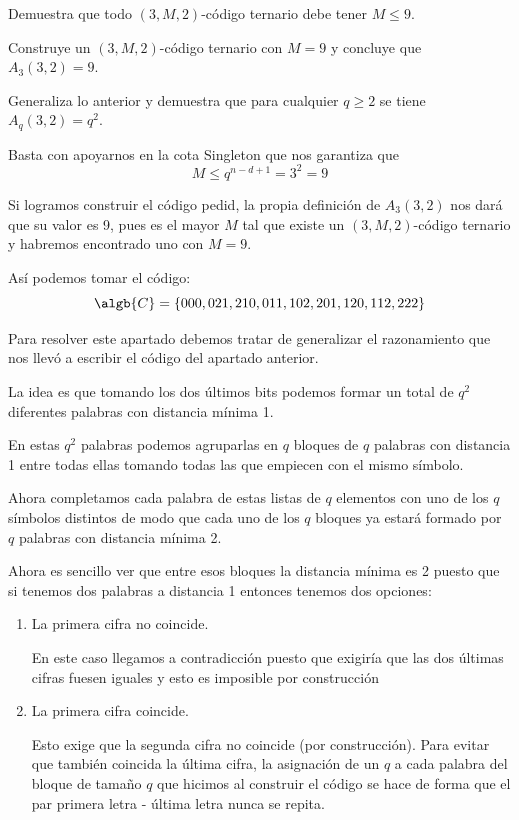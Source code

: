 \begin{problem}[2]
\ppart Demuestra que todo $(3,M,2)$-código ternario debe tener
$M\le 9$.

\ppart Construye un $(3,M,2)$-código ternario con $M=9$ y concluye que
$A_3(3,2)=9$.

\ppart Generaliza lo anterior y demuestra que para cualquier $q\ge 2$
se tiene $A_q(3,2)=q^2$.
\solution


\spart

Basta con apoyarnos en la cota Singleton que nos garantiza que
\[M \leq q^{n-d+1} = 3^{2} = 9\]

\spart

Si logramos construir el código pedid, la propia definición de $A_3(3,2)$ nos dará que su valor es 9, pues es el mayor $M$ tal que existe un $(3,M,2)$-código ternario y habremos encontrado uno con $M=9$.

Así podemos tomar el código:
\[\algb{C}=\{000,021,210,011,102,201,120,112,222\}\]

\spart

Para resolver este apartado debemos tratar de generalizar el razonamiento que nos llevó a escribir el código del apartado anterior.

La idea es que tomando los dos últimos bits podemos formar un total de $q^2$ diferentes palabras con distancia mínima 1.

En estas $q^2$ palabras podemos agruparlas en $q$ bloques de $q$ palabras con distancia 1 entre todas ellas tomando todas las que empiecen con el mismo símbolo.

Ahora completamos cada palabra de estas listas de $q$ elementos con uno de los $q$ símbolos distintos de modo que cada uno de los $q$ bloques ya estará formado por $q$ palabras con distancia mínima 2.

Ahora es sencillo ver que entre esos bloques la distancia mínima es 2 puesto que si tenemos dos palabras a distancia 1 entonces tenemos dos opciones:
\begin{enumerate}
\item La primera cifra no coincide.

En este caso llegamos a contradicción puesto que exigiría que las dos últimas cifras fuesen iguales y esto es imposible por construcción

\item La primera cifra coincide.

Esto exige que la segunda cifra no coincide (por construcción). Para evitar que también coincida la última cifra, la asignación de un $q$ a cada palabra del bloque de tamaño $q$ que hicimos al construir el código se hace de forma que el par primera letra - última letra nunca se repita.
\end{enumerate}

\end{problem}

